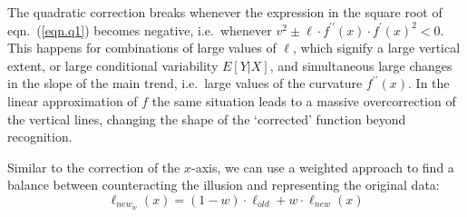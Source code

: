 \documentclass[12pt]{article}\usepackage[]{graphicx}\usepackage[]{color}
\begin{document}

The quadratic correction breaks whenever the expression in the square root of eqn.~(\ref{eqn.q1}) becomes negative, i.e.~whenever $v^2 \pm \ell\cdot f^{\prime\prime}(x)\cdot f^\prime(x)^2 < 0$.
This happens for  combinations of large values of $\ell$, which signify a large vertical extent, or large conditional variability $E[Y|X]$, and simultaneous large changes in the slope of the main trend, i.e.~large values of the curvature $f^{\prime\prime}(x)$. In the linear approximation of $f$ the same situation leads to a massive overcorrection of the vertical lines, changing the shape of the `corrected' function beyond recognition.

Similar to the correction of the $x$-axis,  we can use a weighted approach to find a balance between counteracting the illusion and representing the  original data:
\begin{equation}\label{eqn.ytrans.weighted}
\ell_{new_w}(x) = (1-w) \cdot \ell_{old} + w \cdot \ell_{new}(x)
\end{equation}

\end{document}

